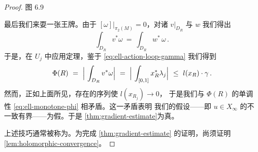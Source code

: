 \begin{proof}
\begin{minipage}{\linewidth}
图 6.9
\end{minipage}

最后我们来耍一张王牌。由于 $[\omega]\big|_{\pi_{2}(M)}=0$，对诸\trDisc{}%
$v\big|_{D_{R}}$ 与 $w$ 我们得出
\begin{equation}\label{eq:ell-equal-periods}
\int_{D_{R}}v^{*}\omega\ =\ \int_{D_{R}}w^{*}\,\omega\,.
\end{equation}
于是，在 $U_{j}$ 中应用\trStokes{}定理，鉴于%
\eqref{eq:ell-action-loop-gamma} 我们得到
\[
\Phi(R)\ =\ \Bigl|\ \int_{D_{R}}v^{*}\omega\Bigr|\ =\ \Bigl|\ \int_{[0,1]}x_{R}^{*}\lambda_{j}\Bigr|\ \leq\ l(x_{R})\cdot\gamma\,.
\]
然而，正如上面所见，存在\trHolomorphic\trDisc{}的序列使 $l(x_{R_{j}})\to0$，%
于是我们与 $\Phi(R)$ 的单调性 \eqref{eq:ell-monotone-phi} 相矛盾。这一矛盾表明%
我们的假设——即 $u\in X_{\infty}$ 的\trGradient{}不一致有界——为假。于是%
\cref{thm:gradient-estimate}为真。

上述技巧通常被称为\trBubblingOffAnalysis。为完成%
\cref{thm:gradient-estimate} 的证明，尚须证明%
\cref{lem:holomorphic-convergence}。


\end{proof}
